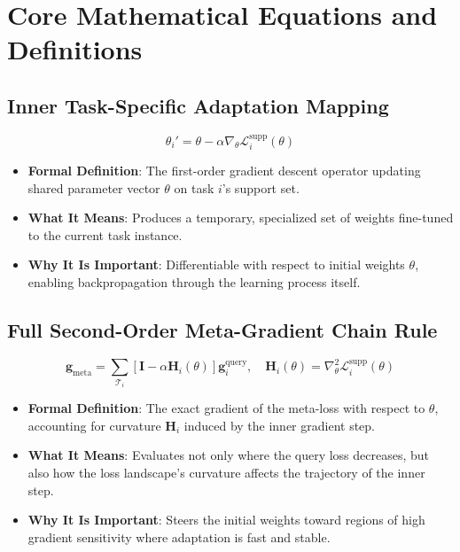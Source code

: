 \documentclass[11pt,a4paper]{article}
\theoremstyle{definition}
\begin{document}
\section{Core Mathematical Equations and Definitions}

\subsection{Inner Task-Specific Adaptation Mapping}
{\boldmath
\begin{equation}
\theta_i' = \theta - \alpha \nabla_\theta \mathcal{L}_i^{\text{supp}}(\theta)
\end{equation}
}
\begin{itemize}
    \item \textbf{Formal Definition}: The first-order gradient descent operator updating shared parameter vector $\theta$ on task $i$'s support set.
    \item \textbf{What It Means}: Produces a temporary, specialized set of weights fine-tuned to the current task instance.
    \item \textbf{Why It Is Important}: Differentiable with respect to initial weights $\theta$, enabling backpropagation through the learning process itself.
\end{itemize}

\subsection{Full Second-Order Meta-Gradient Chain Rule}
{\boldmath
\begin{equation}
\mathbf{g}_{\text{meta}} = \sum_{\mathcal{T}_i} \left[ \mathbf{I} - \alpha \mathbf{H}_i(\theta) \right] \mathbf{g}_i^{\text{query}}, \quad \mathbf{H}_i(\theta) = \nabla_\theta^2 \mathcal{L}_i^{\text{supp}}(\theta)
\end{equation}
}
\begin{itemize}
    \item \textbf{Formal Definition}: The exact gradient of the meta-loss with respect to $\theta$, accounting for curvature $\mathbf{H}_i$ induced by the inner gradient step.
    \item \textbf{What It Means}: Evaluates not only where the query loss decreases, but also how the loss landscape's curvature affects the trajectory of the inner step.
    \item \textbf{Why It Is Important}: Steers the initial weights toward regions of high gradient sensitivity where adaptation is fast and stable.
\end{itemize}
\end{document}
